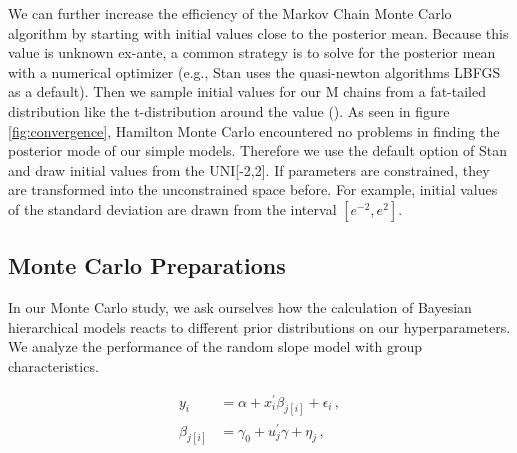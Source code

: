 We can further increase the efficiency of the Markov Chain Monte Carlo algorithm by starting with initial values close to the posterior mean. Because this value is unknown ex-ante, a common strategy is to solve for the posterior mean with a numerical optimizer (e.g., Stan uses the quasi-newton algorithms LBFGS as a default). Then we sample initial values for our M chains from a fat-tailed distribution like the t-distribution around the value (\cite{brooks1998}).
As seen in figure \ref{fig:convergence}, Hamilton Monte Carlo encountered no problems in finding the posterior mode of our simple models. Therefore we use the default option of Stan and draw initial values from the UNI[-2,2]. If parameters are constrained, they are transformed into the unconstrained space before. For example, initial values of the standard deviation are drawn from the interval $[e^{-2},e^2]$.




\subsection{Monte Carlo Preparations}
In our Monte Carlo study, we ask ourselves how the calculation of Bayesian hierarchical models reacts to different prior distributions on our hyperparameters.
We analyze the performance of the random slope model with group characteristics.

\begin{align}
y_i &= \alpha+ x_i^\prime \beta_{j[i]} + \epsilon_i \,,\\
\beta_{j[i]} &= \gamma_0 + u_j^\prime \gamma + \eta_j \,,
\end{align}

